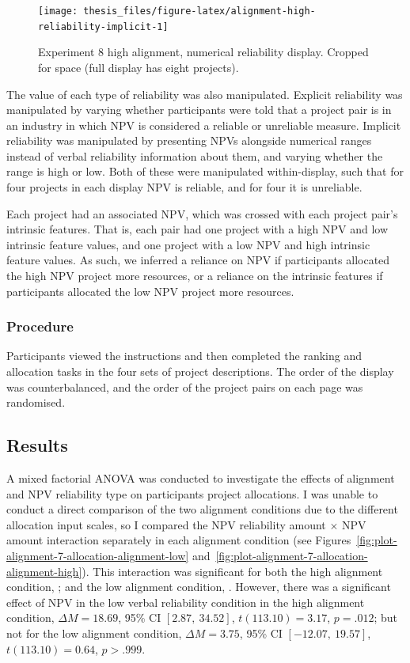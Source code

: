 \documentclass[a4paper, nobind, dvipsnames]{templates/ociamthesis}
\theoremstyle{definition}
\theoremstyle{definition}
\theoremstyle{definition}
\theoremstyle{definition}
\theoremstyle{remark}
\begin{document}
\begin{figure}
\texttt{[image: thesis\_files/figure-latex/alignment-high-reliability-implicit-1]} \caption{Experiment 8 high alignment, numerical reliability display. Cropped for space (full display has eight projects).}\label{fig:alignment-high-reliability-implicit}
\end{figure}

The value of each type of reliability was also manipulated. Explicit reliability
was manipulated by varying whether participants were told that a project pair is
in an industry in which NPV is considered a reliable or unreliable measure.
Implicit reliability was manipulated by presenting NPVs alongside numerical
ranges instead of verbal reliability information about them, and varying
whether the range is high or low. Both of these were manipulated within-display,
such that for four projects in each display NPV is reliable, and for four it is
unreliable.

Each project had an associated NPV, which was crossed with each project pair's
intrinsic features. That is, each pair had one project with a high NPV and low
intrinsic feature values, and one project with a low NPV and high intrinsic
feature values. As such, we inferred a reliance on NPV if participants allocated
the high NPV project more resources, or a reliance on the intrinsic features if
participants allocated the low NPV project more resources.

\hypertarget{procedure-12}{%
\subsubsection{Procedure}\label{procedure-12}}

Participants viewed the instructions and then completed the ranking and
allocation tasks in the four sets of project descriptions. The order of the
display was counterbalanced, and the order of the project pairs on each page was
randomised.

\hypertarget{results-10}{%
\subsection{Results}\label{results-10}}

A mixed factorial ANOVA was conducted to investigate the effects of alignment
and NPV reliability type on participants project allocations. I was unable to
conduct a direct comparison of the two alignment conditions due to the different
allocation input scales, so I compared the NPV reliability amount \(\times\) NPV
amount interaction separately in each alignment condition (see
Figures~\ref{fig:plot-alignment-7-allocation-alignment-low}
and~\ref{fig:plot-alignment-7-allocation-alignment-high}). This interaction was
significant for both the high alignment condition,
;
and the low alignment condition,
.
However, there was a significant effect of NPV in the low verbal reliability
condition in the high alignment condition, \(\Delta M = 18.69\), 95\% CI \([2.87,~34.52]\), \(t(113.10) = 3.17\), \(p = .012\); but not for the low alignment
condition, \(\Delta M = 3.75\), 95\% CI \([-12.07,~19.57]\), \(t(113.10) = 0.64\), \(p > .999\).
\end{document}
